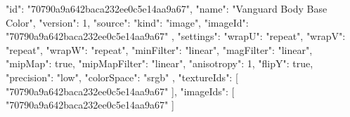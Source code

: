 {
  "id": "70790a9a642baca232ee0c5e14aa9a67",
  "name": "Vanguard Body Base Color",
  "version": 1,
  "source": {
    "kind": "image",
    "imageId": "70790a9a642baca232ee0c5e14aa9a67"
  },
  "settings": {
    "wrapU": "repeat",
    "wrapV": "repeat",
    "wrapW": "repeat",
    "minFilter": "linear",
    "magFilter": "linear",
    "mipMap": true,
    "mipMapFilter": "linear",
    "anisotropy": 1,
    "flipY": true,
    "precision": "low",
    "colorSpace": "srgb"
  },
  "textureIds": [
    "70790a9a642baca232ee0c5e14aa9a67"
  ],
  "imageIds": [
    "70790a9a642baca232ee0c5e14aa9a67"
  ]
}
